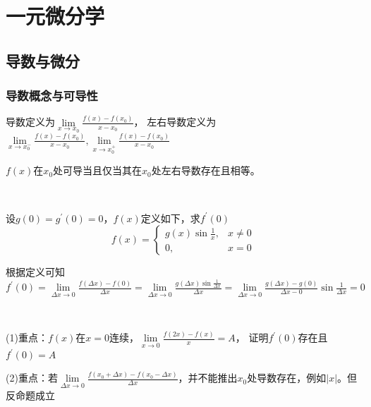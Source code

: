 



\chapter{一元微分学}


\section{导数与微分}

\subsection{导数概念与可导性}

\begin{definition}[导数、左右导数]
  导数定义为$\lim \limits _{x \rightarrow x_0}\frac{f(x) - f(x_0)}{x - x_0}$，
  左右导数定义为$\lim \limits _{x \rightarrow x_0^-}\frac{f(x) - f(x_0)}{x - x_0}, \lim \limits _{x \rightarrow x_0^+} \frac{f(x) - f(x_0)}{x - x_0}$
\end{definition}

\begin{note}
  $f(x)$在$x_0$处可导当且仅当其在$x_0$处左右导数存在且相等。
\end{note}


~

\begin{exercise}[用定义求导函数]
  设$g(0) = g^{\prime}(0) = 0$，$f(x)$定义如下，求$f^{\prime}(0)$
  \begin{equation*}
    f(x) =
    \begin{cases}
      g(x)\sin \frac{1}{x}, & x \neq 0\\
      0,& x = 0
    \end{cases}
  \end{equation*}
\end{exercise}

\begin{solution}
  根据定义可知$f^{\prime}(0) = \lim \limits _{\Delta x \rightarrow 0}\frac{f(\Delta x )- f(0)}{\Delta x} = \lim \limits _{\Delta x \rightarrow 0}\frac{g(\Delta x ) \sin \frac{1}{\Delta x}}{\Delta x} = \lim \limits _{\Delta x \rightarrow 0}\frac{g(\Delta x )- g(0)}{\Delta x - 0} \sin \frac{1}{\Delta x }= 0$
\end{solution}

~

\begin{exercise}[可导概念推广]
  (1)重点：$f(x)$在$x = 0$连续，$\lim \limits _{x \rightarrow 0}\frac{f(2x) - f(x)}{x} = A$，
  证明$f^{\prime}(0)$存在且$f^{\prime}(0) = A$

  (2)重点：若$\lim \limits _{\Delta x \rightarrow 0}\frac{f(x_0 + \Delta x) - f(x_0 - \Delta x)}{\Delta x}$，并不能推出$x_0$处导数存在，例如$|x|$。但反命题成立
\end{exercise}

